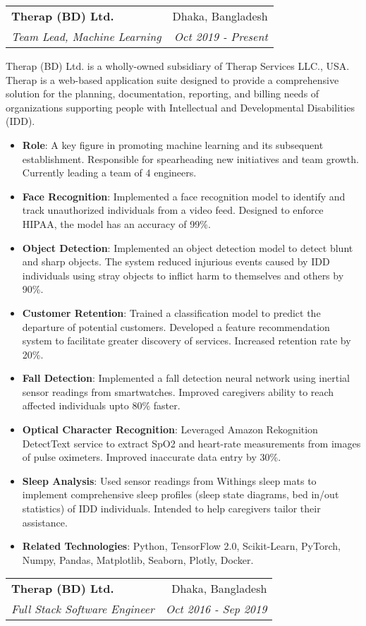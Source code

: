 \documentclass[letterpaper,11pt]{article}
\makeatletter
\newcommand{\resumeItem}[2]{
  \item\small{
    \textbf{#1}{: #2 \vspace{-2pt}}
  }
}
\newcommand{\resumeSubheading}[4]{
  \vspace{-1pt}\item
    \begin{tabular*}{0.97\textwidth}[t]{l@{\extracolsep{\fill}}r}
      \textbf{#1} & #2 \\
      \textit{\small#3} & \textit{\small #4} \\
    \end{tabular*}\vspace{-5pt}
}
\newcommand{\resumeItemListStart}{\begin{itemize}}
\newcommand{\resumeItemListEnd}{\end{itemize}\vspace{-5pt}}
\makeatother
\begin{document}
\resumeSubheading
      {Therap (BD) Ltd.}{Dhaka, Bangladesh}
      {Team Lead, Machine Learning}{Oct 2019 - Present}

      	\begin{flushleft}
			Therap (BD) Ltd. is a wholly-owned subsidiary of Therap Services LLC., USA. Therap is a web-based application suite designed to provide a comprehensive solution for the planning, documentation, reporting, and billing needs of organizations supporting people with Intellectual and Developmental Disabilities (IDD).
      	\end{flushleft}      
      
      \resumeItemListStart
		\resumeItem{Role}{A key figure in promoting machine learning and its subsequent establishment. Responsible for spearheading new initiatives and team growth. Currently leading a team of 4 engineers.}
		\resumeItem{Face Recognition}{Implemented a face recognition model to identify and track unauthorized individuals from a video feed. Designed to enforce HIPAA, the model has an accuracy of 99\%.}
		\resumeItem{Object Detection}{Implemented an object detection model to detect blunt and sharp objects. The system reduced injurious events caused by IDD individuals using stray objects to inflict harm to themselves and others by 90\%.}
		\resumeItem{Customer Retention}{Trained a classification model to predict the departure of potential customers. Developed a feature recommendation system to facilitate greater discovery of services. Increased retention rate by 20\%.}
		\resumeItem{Fall Detection}{Implemented a fall detection neural network using inertial sensor readings from smartwatches. Improved caregivers ability to reach affected individuals upto 80\% faster.}
		\resumeItem{Optical Character Recognition}{Leveraged Amazon Rekognition DetectText service to extract SpO2 and heart-rate measurements from images of pulse oximeters. Improved inaccurate data entry by 30\%.}
		\resumeItem{Sleep Analysis}{Used sensor readings from Withings sleep mats to implement comprehensive sleep profiles (sleep state diagrams, bed in/out statistics) of IDD individuals. Intended to help caregivers tailor their assistance.}		
        \resumeItem{Related Technologies}
          {Python, TensorFlow 2.0, Scikit-Learn, PyTorch, Numpy, Pandas, Matplotlib, Seaborn, Plotly, Docker.}
      \resumeItemListEnd	
	
    	\resumeSubheading
      		{Therap (BD) Ltd.}{Dhaka, Bangladesh}
      		{Full Stack Software Engineer}{Oct 2016 - Sep 2019}
\end{document}

